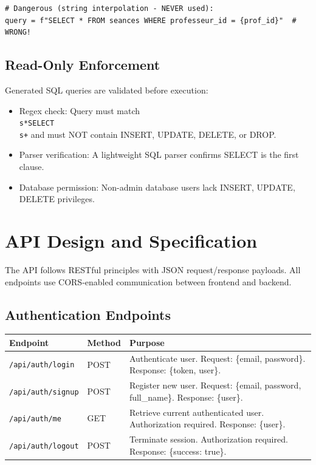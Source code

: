 \begin{fig}[H]
\begin{verbatim}
# Dangerous (string interpolation - NEVER used):
query = f"SELECT * FROM seances WHERE professeur_id = {prof_id}"  # WRONG!
\end{verbatim}

\subsection{Read-Only Enforcement}

Generated SQL queries are validated before execution:

\begin{itemize}
    \item Regex check: Query must match \texttt{\^\\s*SELECT\\s+} and must NOT contain INSERT, UPDATE, DELETE, or DROP.
    \item Parser verification: A lightweight SQL parser confirms SELECT is the first clause.
    \item Database permission: Non-admin database users lack INSERT, UPDATE, DELETE privileges.
\end{itemize}

\section{API Design and Specification}

The API follows RESTful principles with JSON request/response payloads. All endpoints use CORS-enabled communication between frontend and backend.

\subsection{Authentication Endpoints}

\begin{center}
\begin{tabular}{|p{2.5cm}|p{2.5cm}|p{8cm}|}
\hline
\textbf{Endpoint} & \textbf{Method} & \textbf{Purpose} \\
\hline
\texttt{/api/auth/login} & POST & 
Authenticate user. Request: \{email, password\}. Response: \{token, user\}. \\
\hline
\texttt{/api/auth/signup} & POST & 
Register new user. Request: \{email, password, full\_name\}. Response: \{user\}. \\
\hline
\texttt{/api/auth/me} & GET & 
Retrieve current authenticated user. Authorization required. Response: \{user\}. \\
\hline
\texttt{/api/auth/logout} & POST & 
Terminate session. Authorization required. Response: \{success: true\}. \\
\hline
\end{tabular}
\end{center}


\end{fig}
